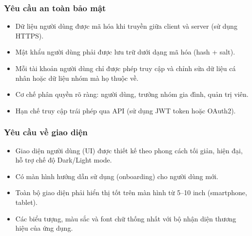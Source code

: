 \subsubsection{Yêu cầu an toàn bảo mật}
\begin{itemize}
    \item Dữ liệu người dùng được mã hóa khi truyền giữa client và server (sử dụng HTTPS).
    \item Mật khẩu người dùng phải được lưu trữ dưới dạng mã hóa (hash + salt).
    \item Mỗi tài khoản người dùng chỉ được phép truy cập và chỉnh sửa dữ liệu cá nhân hoặc dữ liệu nhóm mà họ thuộc về.
    \item Cơ chế phân quyền rõ ràng: người dùng, trưởng nhóm gia đình, quản trị viên.
    \item Hạn chế truy cập trái phép qua API (sử dụng JWT token hoặc OAuth2).
\end{itemize}

\subsubsection{Yêu cầu về giao diện}
\begin{itemize}
    \item Giao diện người dùng (UI) được thiết kế theo phong cách tối giản, hiện đại, hỗ trợ chế độ Dark/Light mode.
    \item Có màn hình hướng dẫn sử dụng (onboarding) cho người dùng mới.
    \item Toàn bộ giao diện phải hiển thị tốt trên màn hình từ 5--10 inch (smartphone, tablet).
    \item Các biểu tượng, màu sắc và font chữ thống nhất với bộ nhận diện thương hiệu của ứng dụng.
\end{itemize}
